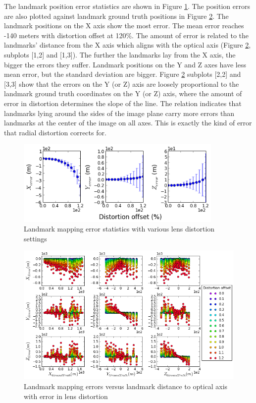 The landmark position error statistics are shown in Figure
\ref{fig:simfig45}. The position errors are also plotted against
landmark ground truth positions in Figure \ref{fig:simfig46}. The
landmark positions on the X axis show the most error. The mean error
reaches -140 meters with distortion offset at 120\%. The amount of
error is related to the landmarks' distance from the X axis which aligns
with the optical axis (Figure \ref{fig:simfig46}, subplots [1,2] and
[1,3]). The further the landmarks lay from the X axis, the bigger the
errors they suffer. Landmark positions on the Y and Z axes have less
mean error, but the standard deviation are bigger. Figure
\ref{fig:simfig46} subplots [2,2] and [3,3] show that the errors on the
Y (or Z) axis are loosely proportional to the landmark ground truth
coordinates on the Y (or Z) axis, where the amount of error in distortion
determines the slope of the line. The relation indicates that
landmarks lying around the sides of the image plane carry more
errors than landmarks at the center of the image on all axes. This is
exactly the kind of error that radial distortion corrects for.

\begin{figure}[h]%
  \centering
  \includegraphics[width=10cm,keepaspectratio=true]{./Figures/SimulationFigures/Figure45.png}
  \caption{Landmark mapping error statistics with various lens
    distortion settings}
  \label{fig:simfig45}
\end{figure}

\begin{figure}[h] %
  \centering
  \includegraphics[width=13cm,keepaspectratio=true]{./Figures/SimulationFigures/Figure46.png}
  \caption{Landmark mapping errors versus landmark distance
    to optical axis with error in lens distortion}
  \label{fig:simfig46}
\end{figure}
\FloatBarrier

